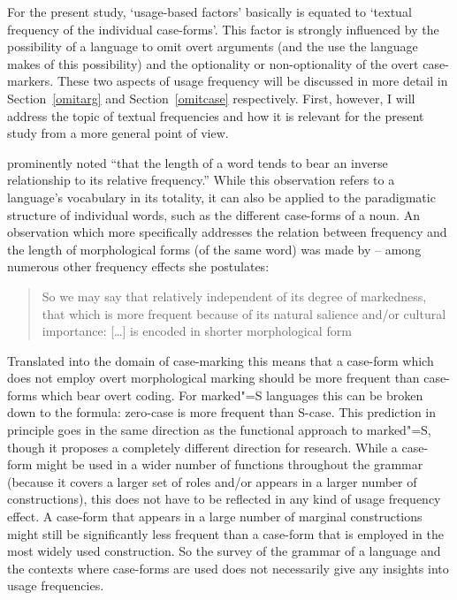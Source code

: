 For the present study, `usage-based factors' basically is equated to `textual frequency of the individual case-forms'. 
This factor is strongly influenced by the possibility of a language to omit overt arguments (and the use the language makes of this possibility) and the optionality or non-optionality of the overt case-markers.  
These two aspects of usage frequency will be discussed in more detail in Section~\ref{omitarg} and Section~\ref{omitcase} respectively.  
First, however, I will address the topic of textual frequencies and how it is relevant for the present study from a more general point of view.

\citet[38]{Zipf:1935} prominently noted ``that the length of a word tends to bear an inverse relationship to its relative frequency.'' 
While this observation refers to a language's vocabulary in its totality, it can also be applied to the paradigmatic structure of individual words, such as the different case-forms of a noun. 
An observation which more specifically addresses the relation between frequency and the length of morphological forms (of the same word) was made by \citet{Fenk:2001}  -- among numerous other frequency effects she postulates:

\begin{quote}
So we may say that relatively independent of its degree of markedness, that which is more frequent because of its natural salience and/or cultural importance: [\dots] is encoded in shorter morphological form \citep[435]{Fenk:2001}
\end{quote}

Translated into the domain of case-marking this means that a case-form which does not employ overt morphological marking should be more frequent than case-forms which bear overt coding. 
For marked"=S languages this can be broken down to the formula: zero-case is more frequent than S-case.
This prediction in principle goes in the same direction as the functional approach to marked"=S, though it proposes a completely different direction for research. 
While a case-form might be used in a wider number of functions throughout the grammar (because it covers a larger set of roles and/or appears in a larger number of constructions), this does not have to be reflected in any kind of usage frequency effect. 
A case-form that appears in a large number of marginal constructions might still be significantly less frequent than a case-form that is employed in the most widely used construction. So the survey of the grammar of a language and the contexts where case-forms are used does not necessarily give any insights into usage frequencies. 

